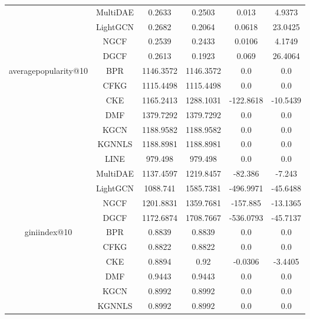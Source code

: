 \begin{table}[H]
{\begin{tabular}{|c|c|c|c|c|c|}
            & MultiDAE & 0.2633 & 0.2503 & 0.013    & 4.9373    \\ \cline{2-6}
            & LightGCN & 0.2682 & 0.2064 & 0.0618   & 23.0425   \\ \cline{2-6}
            & NGCF     & 0.2539 & 0.2433 & 0.0106   & 4.1749    \\ \cline{2-6}
            & DGCF     & 0.2613 & 0.1923 & 0.069    & 26.4064   \\ \hline
            \multirow{11}{*}{averagepopularity@10} 
            & BPR      & 1146.3572 & 1146.3572 & 0.0      & 0.0       \\ \cline{2-6}
            & CFKG     & 1115.4498 & 1115.4498 & 0.0      & 0.0       \\ \cline{2-6}
            & CKE      & 1165.2413 & 1288.1031 & -122.8618 & -10.5439  \\ \cline{2-6}
            & DMF      & 1379.7292 & 1379.7292 & 0.0      & 0.0       \\ \cline{2-6}
            & KGCN     & 1188.9582 & 1188.9582 & 0.0      & 0.0       \\ \cline{2-6}
            & KGNNLS   & 1188.8981 & 1188.8981 & 0.0      & 0.0       \\ \cline{2-6}
            & LINE     & 979.498   & 979.498   & 0.0      & 0.0       \\ \cline{2-6}
            & MultiDAE & 1137.4597 & 1219.8457 & -82.386  & -7.243    \\ \cline{2-6}
            & LightGCN & 1088.741  & 1585.7381 & -496.9971 & -45.6488 \\ \cline{2-6}
            & NGCF     & 1201.8831 & 1359.7681 & -157.885  & -13.1365 \\ \cline{2-6}
            & DGCF     & 1172.6874 & 1708.7667 & -536.0793 & -45.7137 \\ \hline
            \multirow{11}{*}{giniindex@10} 
            & BPR      & 0.8839 & 0.8839 & 0.0      & 0.0       \\ \cline{2-6}
            & CFKG     & 0.8822 & 0.8822 & 0.0      & 0.0       \\ \cline{2-6}
            & CKE      & 0.8894 & 0.92   & -0.0306  & -3.4405   \\ \cline{2-6}
            & DMF      & 0.9443 & 0.9443 & 0.0      & 0.0       \\ \cline{2-6}
            & KGCN     & 0.8992 & 0.8992 & 0.0      & 0.0       \\ \cline{2-6}
            & KGNNLS   & 0.8992 & 0.8992 & 0.0      & 0.0       \\ \cline{2-6}

\end{tabular}}
\end{table}

